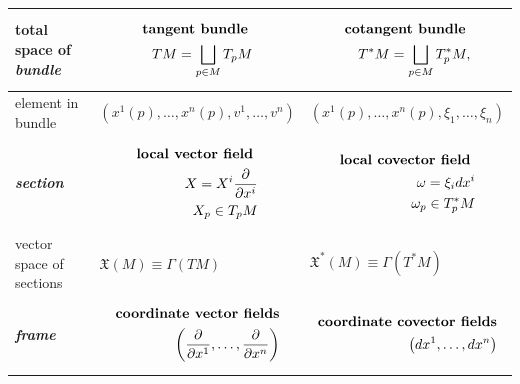 \documentclass[11pt]{article}
\begin{document}
\begin{table}[h!]
\begin{tabularx}{1\textwidth} { 
  | >{\raggedright\arraybackslash} m{2cm}
  | >{\centering\arraybackslash}X
  | >{\centering\arraybackslash}X  | }
\hline
total space of \emph{\textbf{bundle}}   & 
\vspace{-1.25em}
\begin{align*}
 \text{\textbf{tangent bundle} }\\
TM =  \bigsqcup_{p\in M}T_{p}M
 \end{align*} 
 & 
 \vspace{-1.25em}
\begin{align*}
 \text{\textbf{cotangent bundle} }\\
T^{*}M =  \bigsqcup_{p\in M}T_{p}^{*}M, 
 \end{align*}\\
\hline
element in bundle &
$(x^1(p), \ldots, x^{n}(p),  v^1, \ldots, v^{n})$
& 
$(x^1(p), \ldots, x^{n}(p),  \xi_1, \ldots, \xi_{n})$ \\
\hline
\emph{\textbf{section}}  &  
\vspace{-1.25em}
\begin{align*}
\text{\textbf{local vector field} }\\
X = X^{i}\frac{\partial }{ \partial x^{i}}\\
X_{p} \in T_{p}M
\end{align*} \vspace{-1.25em}
&
\vspace{-1.25em}
\begin{align*}
\text{\textbf{local covector field} }\\
\omega = \xi_{i} dx^{i}\\
\omega_p \in T_{p}^{*}M
\end{align*} \vspace{-1.25em} \\
\hline
vector space of sections & $\mathfrak{X}(M) \equiv \Gamma(TM)$ & $\mathfrak{X}^{*}(M) \equiv \Gamma(T^{*}M)$ \\
\hline
\emph{\textbf{frame}} 
&
\vspace{-1.25em}
\begin{align*}
\text{\textbf{coordinate vector fields}}\\
\left(\frac{\partial }{ \partial x^{1}}, \ldots, \frac{\partial }{ \partial x^{n}}\right)
\end{align*} \vspace{-1em} &
\vspace{-1.25em}
\begin{align*}
\text{\textbf{coordinate covector fields}}\\
\left(dx^1, \ldots, dx^{n}\right)
\end{align*} \vspace{-1em}\\

\end{tabularx}
\end{table}
\end{document}
